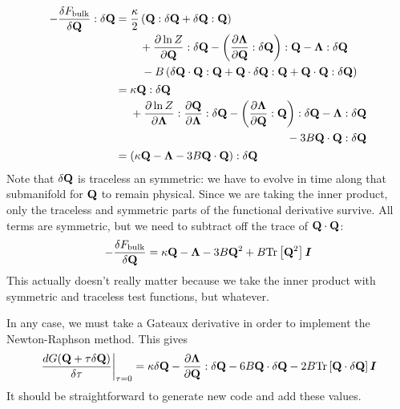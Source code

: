 \documentclass[reqno]{article}
\begin{document}
    \begin{equation}
    \begin{split}
        -\frac{\delta F_\text{bulk}}{\delta \Q} : \delta \Q
        &=
        \begin{multlined}[t]
            \frac{\kappa}{2} \left(\Q : \delta \Q + \delta \Q : \Q \right) \\
            +\frac{\partial \ln Z}{\partial \Q} : \delta \Q
            - \left( \frac{\partial \bLambda}{\partial \Q} : \delta \Q \right) : \Q
            - \bLambda : \delta \Q \\
            - B \left( \delta \Q \cdot \Q : \Q + \Q \cdot \delta \Q : \Q + \Q \cdot \Q : \delta \Q \right)
        \end{multlined} \\
        &=
        \begin{multlined}[t]
            \kappa \Q : \delta \Q \\
            +\frac{\partial \ln Z}{\partial \bLambda} : \frac{\partial \Q}{\partial \bLambda} : \delta \Q
            - \left( \frac{\partial \bLambda}{\partial \Q} : \Q \right) : \delta \Q
            - \bLambda : \delta \Q \\
            - 3 B \Q \cdot \Q : \delta \Q
        \end{multlined} \\
        &=
        \left(\kappa \Q - \bLambda - 3B \Q \cdot \Q \right) : \delta \Q
    \end{split}
    \end{equation}
    Note that $\delta \mathbf{Q}$ is traceless an symmetric: we have to evolve in time along that submanifold for $\mathbf{Q}$ to remain physical.
    Since we are taking the inner product, only the traceless and symmetric parts of the functional derivative survive.
    All terms are symmetric, but we need to subtract off the trace of $\mathbf{Q} \cdot \mathbf{Q}$:
    \begin{equation}
        -\frac{\delta F_\text{bulk}}{\delta \mathbf{Q}}
        =
        \kappa \mathbf{Q}
        - \boldsymbol{\Lambda}
        - 3 B \mathbf{Q}^2
        + B \text{Tr} \left[ \mathbf{Q}^2 \right] \boldsymbol I
    \end{equation}
    This actually doesn't really matter because we take the inner product with symmetric and traceless test functions, but whatever.

    In any case, we must take a Gateaux derivative in order to implement the Newton-Raphson method.
    This gives
    \begin{equation}
        \left. \frac{d G(\mathbf{Q} + \tau \delta \mathbf{Q})}{\delta \tau} \right|_{\tau = 0}
        =
        \kappa \delta \mathbf{Q}
        - \frac{\partial \boldsymbol{\Lambda}}{\partial \mathbf{Q}} : \delta \mathbf{Q}
        - 6 B \mathbf{Q} \cdot \delta \mathbf{Q}
        - 2 B \text{Tr} \left[ \mathbf{Q} \cdot \delta \mathbf{Q} \right] \boldsymbol I
    \end{equation}
    It should be straightforward to generate new code and add these values.
\end{document}
